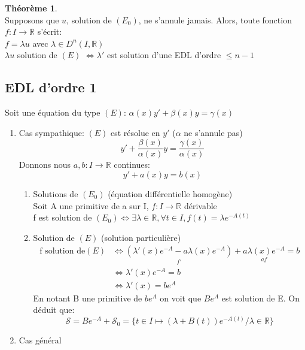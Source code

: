 \documentclass[fleqn]{article}
\theoremstyle{definition} \newtheorem*{defi}{D\'efinition}
\theoremstyle{definition} \newtheorem*{theo}{Th\'eor\`eme}
\theoremstyle{remark} \newtheorem*{rqs}{Remarques}
\begin{document}
\begin{theo} $ $\\
	Supposons que $u$, solution de $(E_0)$, ne s'annule jamais. Alors, toute fonction $f: I \rightarrow \mathbb{R}$ s'\'ecrit:\\
	$f = \lambda u$ avec $\lambda \in D^n(I, \mathbb{R})$ \\
	$\lambda u$ solution de $(E)$ $\Leftrightarrow \lambda '$ est solution d'une EDL d'ordre $\leq n-1$
\end{theo}

\subsection{EDL d'ordre 1}
Soit une \'equation du type $(E)$: $\alpha(x)y' + \beta(x)y = \gamma(x)$

\begin{enumerate}
	\item Cas sympathique: $(E)$ est r\'esolue en $y'$ ($\alpha$ ne s'annule pas)
		\[y' + \frac{\beta(x)}{\alpha(x)}y = \frac{\gamma(x)}{\alpha(x)}\]
		Donnons nous $a, b : I \rightarrow \mathbb{R}$ continues:
		\[y' + a(x)y = b(x)\]
		\begin{enumerate}
			\item Solutions de $(E_0)$ (\'equation diff\'erentielle homog\`ene)\\
				Soit A une primitive de a sur I, $f: I \rightarrow \mathbb{R}$ d\'erivable\\
				f est solution de $(E_0) \Leftrightarrow \exists \lambda \in \mathbb{R}, \forall t \in I, f(t) = \lambda e^{-A(t)}$
			\item Solution de $(E)$ (solution particuli\`ere)
				\begin{align*}
					\text{f solution de} (E) &\Leftrightarrow \underset{f'}{(\lambda'(x) e^{-A} - a \lambda(x) e^{-A})} +
					\underset{af}{a \lambda(x) e^{-A}} = b\\
					&\Leftrightarrow \lambda'(x) e^{-A} = b \\
					&\Leftrightarrow \lambda'(x) = be^A
				\end{align*}
				En notant B une primitive de $be^A$ on voit que $Be^A$ est solution de E. On d\'eduit que:\\
				\[\mathscr{S} = Be^{-A} + \mathscr{S}_0 = \{t\in I \mapsto (\lambda + B(t))e^{-A(t)}/ \lambda \in \mathbb{R}\}\]
		\end{enumerate}
	\item Cas g\'en\'eral
		\begin{enumerate}

\end{enumerate}
\end{enumerate}
\end{document}
